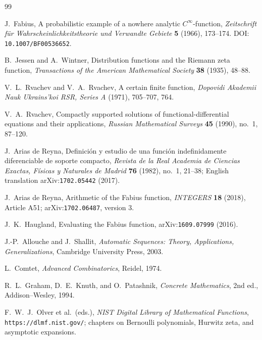 \documentclass[11pt,oneside]{article}
\numberwithin{equation}{section}
\theoremstyle{definition}
\theoremstyle{remark}
\begin{document}
\begin{thebibliography}{99}

J.~Fabius,
\newblock A probabilistic example of a nowhere analytic
$C^\infty$-function,
\newblock \emph{Zeitschrift f\"ur Wahrscheinlichkeitstheorie und
Verwandte Gebiete} \textbf{5} (1966), 173--174.
DOI: \nolinkurl{10.1007/BF00536652}.

B.~Jessen and A.~Wintner,
\newblock Distribution functions and the Riemann zeta function,
\newblock \emph{Transactions of the American Mathematical Society}
\textbf{38} (1935), 48--88.

V.~L.~Rvachev and V.~A.~Rvachev,
\newblock A certain finite function,
\newblock \emph{Dopovidi Akademii Nauk Ukrains'koi RSR, Series A}
(1971), 705--707, 764.

V.~A.~Rvachev,
\newblock Compactly supported solutions of functional-differential
equations and their applications,
\newblock \emph{Russian Mathematical Surveys} \textbf{45} (1990),
no.~1, 87--120.

J.~Arias de Reyna,
\newblock Definici\'on y estudio de una funci\'on indefinidamente
diferenciable de soporte compacto,
\newblock \emph{Revista de la Real Academia de Ciencias Exactas,
F\'isicas y Naturales de Madrid} \textbf{76} (1982), no.~1, 21--38;
English translation arXiv:\nolinkurl{1702.05442} (2017).

J.~Arias de Reyna,
\newblock Arithmetic of the Fabius function,
\newblock \emph{INTEGERS} \textbf{18} (2018), Article A51;
arXiv:\nolinkurl{1702.06487}, version 3.

J.~K.~Haugland,
\newblock Evaluating the Fabius function,
\newblock arXiv:\nolinkurl{1609.07999} (2016).

J.-P.~Allouche and J.~Shallit,
\newblock \emph{Automatic Sequences: Theory, Applications,
Generalizations},
\newblock Cambridge University Press, 2003.

L.~Comtet,
\newblock \emph{Advanced Combinatorics},
\newblock Reidel, 1974.

R.~L.~Graham, D.~E.~Knuth, and O.~Patashnik,
\newblock \emph{Concrete Mathematics}, 2nd ed.,
\newblock Addison--Wesley, 1994.

F.~W.~J.~Olver et al.\ (eds.),
\newblock \emph{NIST Digital Library of Mathematical Functions},
\newblock \nolinkurl{https://dlmf.nist.gov/}; chapters on Bernoulli
polynomials, Hurwitz zeta, and asymptotic expansions.


\end{thebibliography}
\end{document}
